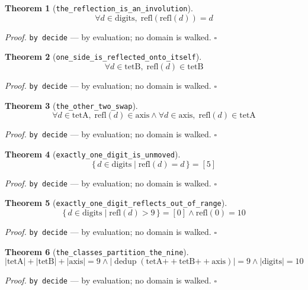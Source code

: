 \documentclass[11pt]{article}
\newtheorem{theorem}{Theorem}[section]
\begin{document}
\begin{theorem}[\texttt{the\_reflection\_is\_an\_involution}]
\[ \forall d \in \mathrm{digits},\; \mathrm{refl}\mathopen{}\left(\mathrm{refl}\mathopen{}\left(d\right)\right) = d \]
\end{theorem}
\noindent\emph{Proof.} \texttt{by decide} --- by evaluation; no domain is walked. \hfill$\square$

\begin{theorem}[\texttt{one\_side\_is\_reflected\_onto\_itself}]
\[ \forall d \in \mathrm{tetB},\; \mathrm{refl}\mathopen{}\left(d\right) \in \mathrm{tetB} \]
\end{theorem}
\noindent\emph{Proof.} \texttt{by decide} --- by evaluation; no domain is walked. \hfill$\square$

\begin{theorem}[\texttt{the\_other\_two\_swap}]
\[ \forall d \in \mathrm{tetA},\; \mathrm{refl}\mathopen{}\left(d\right) \in \mathrm{axis} \land \forall d \in \mathrm{axis},\; \mathrm{refl}\mathopen{}\left(d\right) \in \mathrm{tetA} \]
\end{theorem}
\noindent\emph{Proof.} \texttt{by decide} --- by evaluation; no domain is walked. \hfill$\square$

\begin{theorem}[\texttt{exactly\_one\_digit\_is\_unmoved}]
\[ \{\, d \in \mathrm{digits} \mid \mathrm{refl}\mathopen{}\left(d\right) = d \,\} = [5] \]
\end{theorem}
\noindent\emph{Proof.} \texttt{by decide} --- by evaluation; no domain is walked. \hfill$\square$

\begin{theorem}[\texttt{exactly\_one\_digit\_reflects\_out\_of\_range}]
\[ \{\, d \in \mathrm{digits} \mid \mathrm{refl}\mathopen{}\left(d\right) > 9 \,\} = [0] \land \mathrm{refl}\mathopen{}\left(0\right) = 10 \]
\end{theorem}
\noindent\emph{Proof.} \texttt{by decide} --- by evaluation; no domain is walked. \hfill$\square$

\begin{theorem}[\texttt{the\_classes\_partition\_the\_nine}]
\[ \left|\mathrm{tetA}\right| + \left|\mathrm{tetB}\right| + \left|\mathrm{axis}\right| = 9 \land \left|\operatorname{dedup}\left(\mathrm{tetA} \mathbin{+\!\!+} \mathrm{tetB} \mathbin{+\!\!+} \mathrm{axis}\right)\right| = 9 \land \left|\mathrm{digits}\right| = 10 \]
\end{theorem}
\noindent\emph{Proof.} \texttt{by decide} --- by evaluation; no domain is walked. \hfill$\square$
\end{document}
